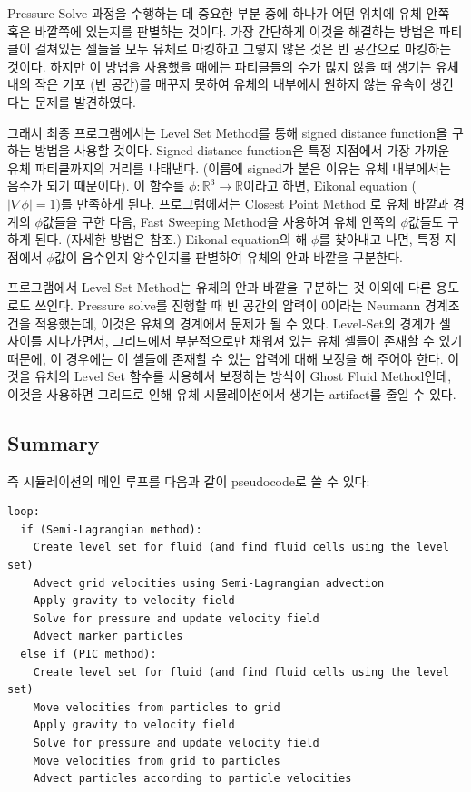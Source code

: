 \documentclass[11pt, A4]{article}
\begin{document}
Pressure Solve 과정을 수행하는 데 중요한 부분 중에 하나가 어떤 위치에 유체 안쪽 혹은 바깥쪽에 있는지를 판별하는 것이다. 가장 간단하게 이것을 해결하는 방법은 파티클이 걸쳐있는 셀들을 모두 유체로 마킹하고 그렇지 않은 것은 빈 공간으로 마킹하는 것이다. 하지만 이 방법을 사용했을 때에는 파티클들의 수가 많지 않을 때 생기는 유체 내의 작은 기포 (빈 공간)를 매꾸지 못하여 유체의 내부에서 원하지 않는 유속이 생긴다는 문제를 발견하였다.

그래서 최종 프로그램에서는 Level Set Method를 통해 signed distance function을 구하는 방법을 사용할 것이다. Signed distance function은 특정 지점에서 가장 가까운 유체 파티클까지의 거리를 나태낸다. (이름에 signed가 붙은 이유는 유체 내부에서는 음수가 되기 때문이다). 이 함수를 $\phi: \mathbb{R}^3 \rightarrow \mathbb{R}$이라고 하면, Eikonal equation ($|\nabla \phi| = 1$)를 만족하게 된다. 프로그램에서는 Closest Point Method \cite[p. 11]{dist-function}로 유체 바깥과 경계의 $\phi$값들을 구한 다음, Fast Sweeping Method\cite{fast-sweeping}을 사용하여 유체 안쪽의 $\phi$값들도 구하게 된다. (자세한 방법은 \cite[p.49-p.56, p.126]{fluid-sim-cg} 참조.) Eikonal equation의 해 $\phi$를 찾아내고 나면, 특정 지점에서 $\phi$값이 음수인지 양수인지를 판별하여 유체의 안과 바깥을 구분한다.

프로그램에서 Level Set Method는 유체의 안과 바깥을 구분하는 것 이외에 다른 용도로도 쓰인다. Pressure solve를 진행할 때 빈 공간의 압력이 0이라는 Neumann 경계조건을 적용했는데, 이것은 유체의 경계에서 문제가 될 수 있다. Level-Set의 경계가 셀 사이를 지나가면서, 그리드에서 부분적으로만 채워져 있는 유체 셀들이 존재할 수 있기 때문에, 이 경우에는 이 셀들에 존재할 수 있는 압력에 대해 보정을 해 주어야 한다. 이것을 유체의 Level Set 함수를 사용해서 보정하는 방식이 Ghost Fluid Method인데, 이것을 사용하면 그리드로 인해 유체 시뮬레이션에서 생기는 artifact를 줄일 수 있다. \cite[p.127-129]{fluid-sim-cg}

\subsection{Summary}

즉 시뮬레이션의 메인 루프를 다음과 같이 pseudocode로 쓸 수 있다:

\begin{verbatim}
loop:
  if (Semi-Lagrangian method):
    Create level set for fluid (and find fluid cells using the level set)
    Advect grid velocities using Semi-Lagrangian advection 
    Apply gravity to velocity field
    Solve for pressure and update velocity field
    Advect marker particles
  else if (PIC method):
    Create level set for fluid (and find fluid cells using the level set)
    Move velocities from particles to grid
    Apply gravity to velocity field
    Solve for pressure and update velocity field
    Move velocities from grid to particles
    Advect particles according to particle velocities
\end{verbatim}
\end{document}
